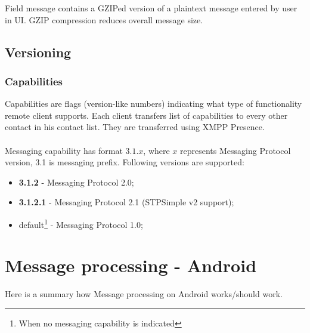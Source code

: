\documentclass[a4paper,10pt]{article}
\begin{document}
Field message contains a GZIPed version of a plaintext message entered by user in UI. GZIP compression reduces 
overall message size.

\subsection{Versioning}

\subsubsection{Capabilities}
Capabilities are flags (version-like numbers) indicating what type of functionality remote client supports. Each client transfers list of capabilities to every other contact in his contact list. They are transferred using XMPP Presence.\\ \\
Messaging capability has format $3.1.x$, where $x$ represents Messaging Protocol version, 3.1 is messaging prefix. Following versions are supported:

\begin{itemize}
\item \textbf{3.1.2} - Messaging Protocol 2.0;
\item \textbf{3.1.2.1} - Messaging Protocol 2.1 (STPSimple v2 support);
\item default\footnote{When no messaging capability is indicated} - Messaging Protocol 1.0;

\end{itemize}





\section{Message processing - Android}
Here is a summary how Message processing on Android works/should work.
\end{document}
